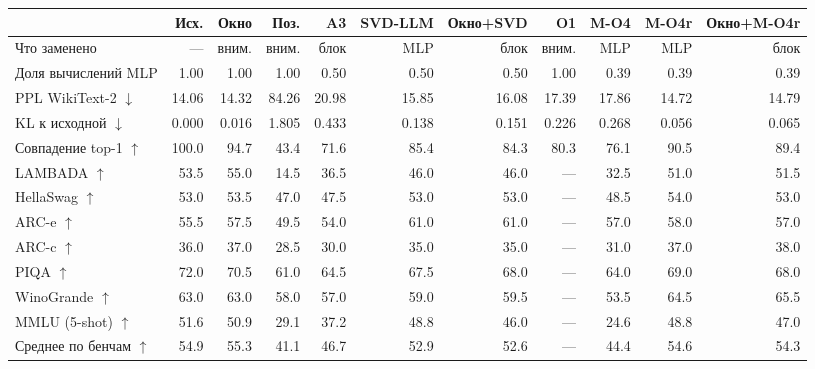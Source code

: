 \begin{tabular}{lrrrrrrrrrr}
\toprule
 & Исх. & Окно & Поз. & A3 & SVD-LLM & Окно+SVD & O1 & M-O4 & M-O4r & Окно+M-O4r \\
\midrule
Что заменено & — & вним. & вним. & блок & MLP & блок & вним. & MLP & MLP & блок \\
Доля вычислений MLP & 1.00 & 1.00 & 1.00 & 0.50 & 0.50 & 0.50 & 1.00 & 0.39 & 0.39 & 0.39 \\
PPL WikiText-2 $\downarrow$ & 14.06 & 14.32 & 84.26 & 20.98 & 15.85 & 16.08 & 17.39 & 17.86 & 14.72 & 14.79 \\
KL к исходной $\downarrow$ & 0.000 & 0.016 & 1.805 & 0.433 & 0.138 & 0.151 & 0.226 & 0.268 & 0.056 & 0.065 \\
Совпадение top-1 $\uparrow$ & 100.0 & 94.7 & 43.4 & 71.6 & 85.4 & 84.3 & 80.3 & 76.1 & 90.5 & 89.4 \\
LAMBADA $\uparrow$ & 53.5 & 55.0 & 14.5 & 36.5 & 46.0 & 46.0 & — & 32.5 & 51.0 & 51.5 \\
HellaSwag $\uparrow$ & 53.0 & 53.5 & 47.0 & 47.5 & 53.0 & 53.0 & — & 48.5 & 54.0 & 53.0 \\
ARC-e $\uparrow$ & 55.5 & 57.5 & 49.5 & 54.0 & 61.0 & 61.0 & — & 57.0 & 58.0 & 57.0 \\
ARC-c $\uparrow$ & 36.0 & 37.0 & 28.5 & 30.0 & 35.0 & 35.0 & — & 31.0 & 37.0 & 38.0 \\
PIQA $\uparrow$ & 72.0 & 70.5 & 61.0 & 64.5 & 67.5 & 68.0 & — & 64.0 & 69.0 & 68.0 \\
WinoGrande $\uparrow$ & 63.0 & 63.0 & 58.0 & 57.0 & 59.0 & 59.5 & — & 53.5 & 64.5 & 65.5 \\
MMLU (5-shot) $\uparrow$ & 51.6 & 50.9 & 29.1 & 37.2 & 48.8 & 46.0 & — & 24.6 & 48.8 & 47.0 \\
Среднее по бенчам $\uparrow$ & 54.9 & 55.3 & 41.1 & 46.7 & 52.9 & 52.6 & — & 44.4 & 54.6 & 54.3 \\
\bottomrule
\end{tabular}
